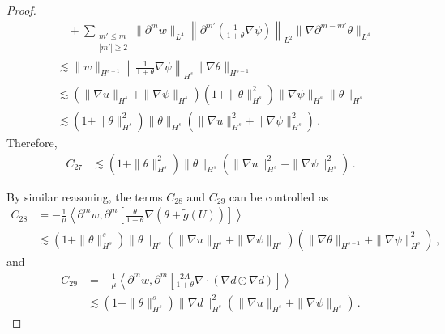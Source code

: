 \documentclass[10pt,a4paper]{amsart}
\begin{document}
\begin{proof}
\begin{equation*}
\begin{aligned}
&\quad + \sum_{\substack{m' \leq m \\ |m'| \geq 2}} \|\partial^m w\|_{L^4} \left\| \partial^{m'} \left(\frac{1}{1+\theta} \nabla \psi\right) \right\|_{L^2} \|\nabla \partial^{m-m'} \theta\|_{L^4} \\
&\lesssim \|w\|_{H^{s+1}} \left\| \frac{1}{1+\theta} \nabla \psi \right\|_{H^s} \|\nabla \theta\|_{H^{s-1}} \\
&\lesssim (\|\nabla u\|_{H^s} + \|\nabla \psi\|_{H^s}) (1 + \|\theta\|_{H^s}^2) \|\nabla \psi\|_{H^s} \|\theta\|_{H^s} \\
&\lesssim (1 + \|\theta\|_{H^s}^2) \|\theta\|_{H^s} (\|\nabla u\|_{H^s}^2 + \|\nabla \psi\|_{H^s}^2) \,.
\end{aligned}
\end{equation*}
Therefore,
\begin{equation}\label{gpsi-eq21}
\begin{aligned}
C_{27}&\lesssim \left( 1 + \|\theta\|_{H^s}^2 \right) \|\theta\|_{H^s} (\|\nabla u\|_{H^s}^2 + \|\nabla \psi\|_{H^s}^2) \,.
\end{aligned}
\end{equation}

By similar reasoning, the terms $C_{28}$ and $C_{29}$ can be controlled as
\begin{equation}\label{gpsi-eq22}
\begin{aligned}
C_{28}&= -\frac{1}{\mu} \left\langle \partial^m w, \partial^m \left[\frac{\theta}{1+\theta} \nabla (\theta + \tilde{g}(U))\right] \right\rangle \\
&\lesssim (1 + \|\theta\|_{H^s}^s) \|\theta\|_{H^s} (\|\nabla u\|_{H^s} + \|\nabla \psi\|_{H^s}) (\|\nabla \theta\|_{H^{s-1}} + \|\nabla \psi\|_{H^s}^2) \,,
\end{aligned}
\end{equation}
and 
\begin{equation}\label{gpsi-eq23}
\begin{aligned}
C_{29}&=-\frac{1}{\mu} \left\langle \partial^m w, \partial^m \left[\frac{2A}{1+\theta} \nabla \cdot (\nabla d \odot \nabla d)\right] \right\rangle \\
&\lesssim (1 + \|\theta\|_{H^s}^s) \|\nabla d\|_{H^s}^2 (\|\nabla u\|_{H^s} + \|\nabla \psi\|_{H^s}) \,.
\end{aligned}
\end{equation}


\end{proof}
\end{document}
